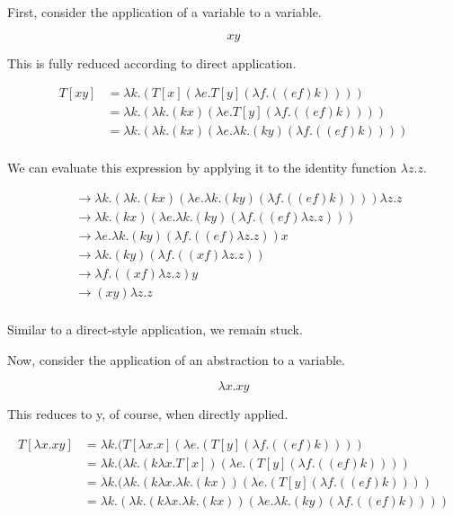 \documentclass[ms,electronic,twosidetoc,letterpaper,chaptercenter,parttop]{byumsphd}
\begin{document}
First, consider the application of a variable to a variable.

\[
x y
\]

This is fully reduced according to direct application.

\begin{align*}
T[x y] &= \lambda k.(T[x] (\lambda e.T[y] (\lambda f.((e f) k))))\\
       &= \lambda k.(\lambda k.(k x) (\lambda e.T[y] (\lambda f.((e f) k))))\\
       &= \lambda k.(\lambda k.(k x) (\lambda e.\lambda k.(k y) (\lambda f.((e f) k))))\\
\end{align*}

We can evaluate this expression by applying it to the identity function $\lambda z.z$.

\begin{align*}
&\rightarrow \lambda k.(\lambda k.(k x) (\lambda e.\lambda k.(k y) (\lambda f.((e f) k)))) \lambda z.z\\
&\rightarrow \lambda k.(k x) (\lambda e.\lambda k.(k y) (\lambda f.((e f) \lambda z.z)))\\
&\rightarrow \lambda e.\lambda k.(k y) (\lambda f.((e f) \lambda z.z)) x\\
&\rightarrow \lambda k.(k y) (\lambda f.((x f) \lambda z.z))\\
&\rightarrow \lambda f.((x f) \lambda z.z) y\\
&\rightarrow (x y) \lambda z.z\\
\end{align*}

Similar to a direct-style application, we remain stuck.

Now, consider the application of an abstraction to a variable.

\[
\lambda x.x y
\]

This reduces to y, of course, when directly applied.

\begin{align*}
T[\lambda x.x y] &= \lambda k.(T[\lambda x.x] (\lambda e.(T[y] (\lambda f.((e f) k))))\\
                 &= \lambda k.(\lambda k.(k \lambda x.T[x]) (\lambda e.(T[y] (\lambda f.((e f) k))))\\
                 &= \lambda k.(\lambda k.(k \lambda x.\lambda k.(k x)) (\lambda e.(T[y] (\lambda f.((e f) k))))\\
                 &= \lambda k.(\lambda k.(k \lambda x.\lambda k.(k x)) (\lambda e.\lambda k.(k y) (\lambda f.((e f) k))))\\
\end{align*}
\end{document}
